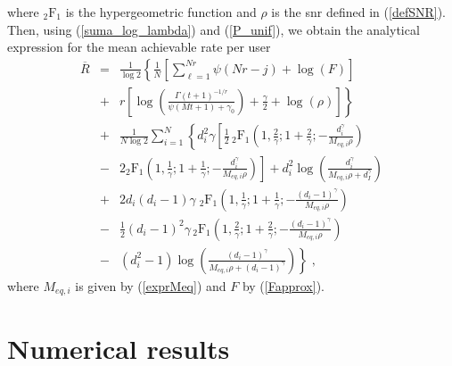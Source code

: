 where $\mbox{$_2$F$_1$}$ is the hypergeometric function and $\rho$ is the \gls{snr} defined in (\ref{defSNR}).
Then, using (\ref{suma_log_lambda}) and (\ref{P_unif}), we obtain the analytical expression for the mean achievable rate per user 
\begin{eqnarray}
 \overline{R} &=& \frac{1}{\log 2}\left\{\frac{1}{N}\left[\sum_{\ell=1}^{Nr} \psi(Nr-j) 
 + \log\left( F \right) \right]\right.\nonumber\\
&+& \left.r\left[\log \left(\frac{\Gamma(t+1)^{-1/r}}{\psi(Mt+1)+\gamma_0}\right)+\frac{\gamma}{2}+\log(\rho)\right] \right\}\nonumber\\ 
        &+&\frac{1}{N\log 2}\sum_{i=1}^{N}
        \left\{ 
d_i^2\gamma\left[\frac{1}{2} \,\mbox{$_2$F$_1$}\left(1,\frac{2}{\gamma};1+\frac{2}{\gamma};-\frac{d_i^\gamma}{M_{eq,i}\rho}\right)\right.\right.\nonumber\\
&-&\left.2\mbox{$_2$F$_1$}\left(1,\frac{1}{\gamma};1+\frac{1}{\gamma};-\frac{d_i^\gamma}{M_{eq,i}\rho}\right)\right]
        + d_i^2 \log\left(\frac{d_i^\gamma}{M_{eq,i}\rho+d_I^\gamma}\right)\nonumber\\  
        &+& 2d_i(d_i-1)\gamma \;\mbox{$_2$F$_1$}\left(1,\frac{1}{\gamma};1+\frac{1}{\gamma};-\frac{(d_i-1)^\gamma}{M_{eq,i}\rho}\right)\nonumber\\ 
        &-&\left.\frac{1}{2} (d_i-1)^2\gamma\, \mbox{$_2$F$_1$}\left(1,\frac{2}{\gamma};1+\frac{2}{\gamma};-\frac{(d_i-1)^\gamma}{M_{eq,i}\rho}\right)\right.\nonumber\\
             &-&\left. (d_i^2-1) \log\left(\frac{(d_i-1)^\gamma}{M_{eq,i}\rho+(d_i-1)^\gamma}\right) \right\}\;,\label{final_rate}
\end{eqnarray}
where $M_{eq,i}$ is given by (\ref{exprMeq}) and $F$ by (\ref{Fapprox}).

\section{Numerical results}\label{results}

